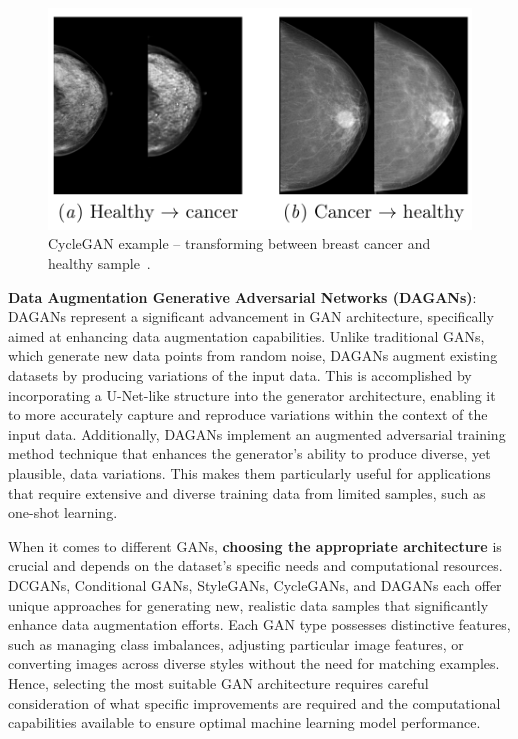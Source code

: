\begin{figure}[!htb]
    \centering
    \includegraphics[scale=0.6]{Images/cycle-gan-breast-cancer.png}
    \caption{CycleGAN example -- transforming between breast cancer and healthy sample~\cite{CycleGANBreastCancer}.}
    \label{fig:cycleGANBreastCancer}
\end{figure}

\textbf{Data Augmentation Generative Adversarial Networks (DAGANs)}: DAGANs represent a significant advancement in GAN architecture, specifically aimed at enhancing data augmentation capabilities. Unlike traditional GANs, which generate new data points from random noise, DAGANs augment existing datasets by producing variations of the input data. This is accomplished by incorporating a U-Net-like structure into the generator architecture, enabling it to more accurately capture and reproduce variations within the context of the input data. Additionally, DAGANs implement an augmented adversarial training method technique that enhances the generator's ability to produce diverse, yet plausible, data variations. This makes them particularly useful for applications that require extensive and diverse training data from limited samples, such as one-shot learning.

When it comes to different GANs, \textbf{choosing the appropriate architecture} is crucial and depends on the dataset's specific needs and computational resources. DCGANs, Conditional GANs, StyleGANs, CycleGANs, and DAGANs each offer unique approaches for generating new, realistic data samples that significantly enhance data augmentation efforts. Each GAN type possesses distinctive features, such as managing class imbalances, adjusting particular image features, or converting images across diverse styles without the need for matching examples. Hence, selecting the most suitable GAN architecture requires careful consideration of what specific improvements are required and the computational capabilities available to ensure optimal machine learning model performance.

